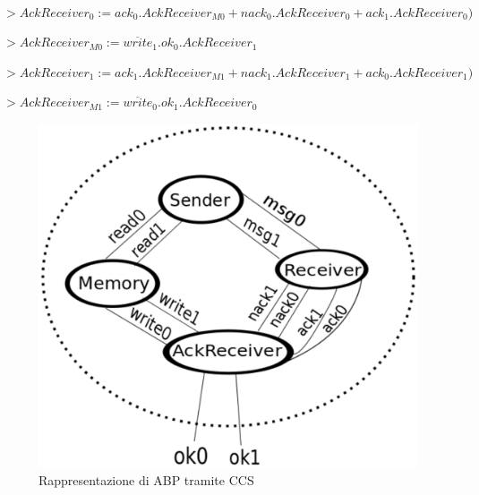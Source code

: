$ $

$ > AckReceiver_0 := ack_0.AckReceiver_{M0} +
                     nack_0.AckReceiver_0 + ack_1.AckReceiver_0) $

$ > AckReceiver_{M0} := \overline{write}_1.ok_0.AckReceiver_1 $

$ > AckReceiver_1 := ack_1.AckReceiver_{M1} +
                     nack_1.AckReceiver_1 + ack_0.AckReceiver_1) $

$ > AckReceiver_{M1} := \overline{write}_0.ok_1.AckReceiver_0 $

\begin{figure}[H]
  \centering
  \includegraphics[width=.5\columnwidth]{images/ccs.eps}
  \caption{Rappresentazione di ABP tramite CCS}
  \label{fig:ccs-abp}
\end{figure}
